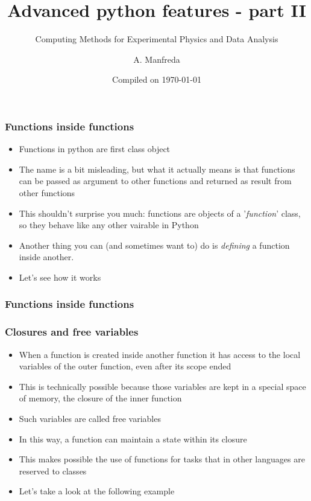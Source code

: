 \documentclass[9pt]{beamer}
\title{Advanced python features - part II}
\subtitle{Computing Methods for Experimental Physics and Data Analysis}
\date{Compiled on \today}
\author{A. Manfreda}
\institute[INFN]{INFN--Pisa}
\begin{document}
\titleframe


\begin{frame}
  \frametitle{Functions inside functions}
  \begin{itemize}
    \item Functions in python are \alert{first class object}
    \item The name is a bit misleading, but what it actually means is that functions
          can be passed as argument to other functions and returned as result from
          other functions
    \item This shouldn't surprise you much: functions are objects of a
          '\emph{function}' class, so they behave like any other vairable in
          Python
    \item Another thing you can (and sometimes want to) do is \emph{defining} a
          function inside another.
    \item Let's see how it works
  \end{itemize}
  
\end{frame}


\begin{frame}
  \frametitle{Functions inside functions}
  
\end{frame}


\begin{frame}
  \frametitle{Closures and free variables}
  \begin{itemize}
    \item When a function is created inside another function it has access to
          the local variables of the outer function, even after its scope ended
    \smallskip
    \item This is technically possible because those variables are kept in a special
          space of memory, the \alert{closure} of the inner function
    \smallskip
    \item Such variables are called \alert{free variables}
    \smallskip
    \item In this way, a function can maintain a \alert{state} within its closure
    \smallskip
    \item This makes possible the use of functions for tasks that in other
          languages are reserved to classes
    \smallskip
    \item Let's take a look at the following example
  \end{itemize}
\end{frame}
\end{document}

